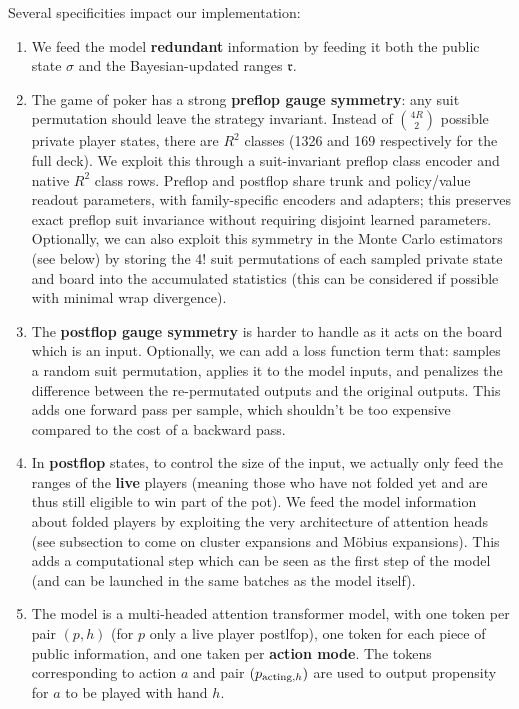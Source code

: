 \documentclass[12pt, a4paper]{article}
\begin{document}
Several specificities impact our implementation:
\begin{enumerate}
  \item We feed the model \textbf{redundant} information by feeding it both the public state $\sigma$ and the Bayesian-updated ranges $\mathfrak{r}$.
  
  \item The game of poker has a strong \textbf{preflop gauge symmetry}: any suit permutation should leave the strategy invariant.
  Instead of $\binom{4R}{2}$ possible private player states, there are $R^2$
  classes (1326 and 169 respectively for the full deck).
  We exploit this through a suit-invariant preflop class encoder and native $R^2$ class rows. Preflop and postflop share trunk and policy/value readout parameters, with family-specific encoders and adapters; this preserves exact preflop suit invariance without requiring disjoint learned parameters.
  Optionally, we can also exploit this symmetry in the Monte Carlo estimators (see below) by storing the $4!$ suit permutations of each sampled private state and board into the accumulated statistics (this can be considered if possible with minimal wrap divergence).
  
  \item The \textbf{postflop gauge symmetry} is harder to handle as it acts on the board which is an input.
  Optionally, we can add a loss function term that: samples a random suit permutation, applies it to the model inputs, and penalizes the difference between the re-permutated outputs and the original outputs.
  This adds one forward pass per sample, which shouldn't be too expensive compared to the cost of a backward pass. 
  
  \item In \textbf{postflop} states, to control the size of the input, we actually only feed the ranges of the \textbf{live} players (meaning those who have not folded yet and are thus still eligible to win part of the pot).
  We feed the model information about folded players by exploiting the very architecture of attention heads (see subsection to come on cluster expansions and Möbius expansions).
  This adds a computational step which can be seen as the first step of the model (and can be launched in the same batches as the model itself).

  \item The model is a multi-headed attention transformer model, with one token per pair $(p,h)$ (for $p$ only a live player postlfop), one token for each piece of public information, and one taken per \textbf{action mode}.
  The tokens corresponding to action $a$ and pair $(p_{\textnormal{acting}, h})$ are used to output propensity for $a$ to be played with hand $h$.


\end{enumerate}
\end{document}
